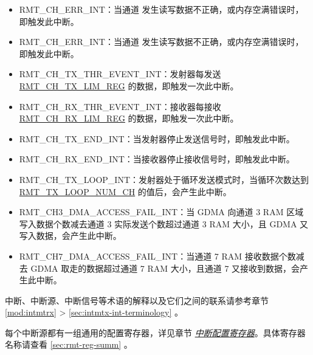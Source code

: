 \documentclass[main\_\_CN.tex]{subfiles}
\begin{document}
\begin{itemize}
\item \label{int:RMTCHNERRINT}RMT\_CH\_ERR\_INT：当通道  发生读写数据不正确，或内存空满错误时，即触发此中断。
\item \label{int:RMTCHMERRINT}RMT\_CH\_ERR\_INT：当通道  发生读写数据不正确，或内存空满错误时，即触发此中断。
\item \label{int:RMTCHNTXTHREVENTINT}RMT\_CH\_TX\_THR\_EVENT\_INT：发射器每发送 \hyperref[regdesc:RMTCHNTXLIMREG]{RMT\_CH\_TX\_LIM\_REG} 的数据，即触发一次此中断。
\item \label{int:RMTCHMRXTHREVENTINT}RMT\_CH\_RX\_THR\_EVENT\_INT：接收器每接收 \hyperref[fielddesc:RMTCHMRXLIMREG]{RMT\_CH\_RX\_LIM\_REG} 的数据，即触发一次此中断。
\item \label{int:RMTCHNTXENDINT}RMT\_CH\_TX\_END\_INT：当发射器停止发送信号时，即触发此中断。
\item \label{int:RMTCHMRXENDINT}RMT\_CH\_RX\_END\_INT：当接收器停止接收信号时，即触发此中断。
\item \label{int:RMTCHNTXLOOPINT}RMT\_CH\_TX\_LOOP\_INT：发射器处于循环发送模式时，当循环次数达到 \hyperref[fielddesc:RMTTXLOOPNUMCHN]{RMT\_TX\_LOOP\_NUM\_CH} 的值后，会产生此中断。
\item \label{int:RMTCHNDMAACCESSFAILINT}RMT\_CH3\_DMA\_ACCESS\_FAIL\_INT：当 GDMA 向通道 3 RAM 区域写入数据个数减去通道 3 实际发送个数超过通道 3 RAM 大小，且 GDMA 又写入数据，会产生此中断。
\item \label{int:RMTCHMDMAACCESSFAILINT}RMT\_CH7\_DMA\_ACCESS\_FAIL\_INT：当通道 7 RAM 接收数据个数减去 GDMA 取走的数据超过通道 7 RAM 大小，且通道 7 又接收到数据，会产生此中断。
\end{itemize}

\begin{tiplisting}
中断、中断源、中断信号等术语的解释以及它们之间的联系请参考章节 \ref{mod:intmtrx} \textit{} > \ref{sec:intmtx-int-terminology} \textit{}。
\end{tiplisting}

每个中断源都有一组通用的配置寄存器，详见章节 \hyperref[interrupt-config-registers]{\textit{中断配置寄存器}}。具体寄存器名称请查看 \ref{sec:rmt-reg-summ} \textit{}。


\end{document}
